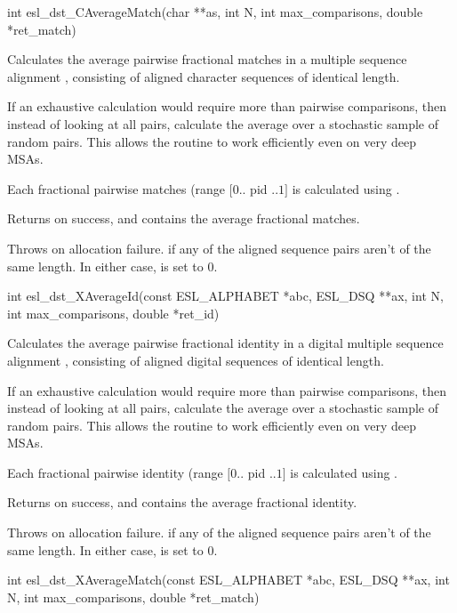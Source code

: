\begin{sreapi}
\hypertarget{func:esl_dst_CAverageMatch()}
{\item[int esl\_dst\_CAverageMatch(char **as, int N, int max\_comparisons, double *ret\_match)]}

Calculates the average pairwise fractional matches in
a multiple sequence alignment , consisting of 
aligned character sequences of identical length.

If an exhaustive calculation would require more than
 pairwise comparisons, then instead of
looking at all pairs, calculate the average over a
stochastic sample of  random pairs.
This allows the routine to work efficiently even on very
deep MSAs.

Each fractional pairwise matches (range $[0..$ pid $..1]$
is calculated using .

Returns  on success, and  contains the average
fractional matches.

Throws  on allocation failure.
 if any of the aligned sequence pairs aren't 
of the same length.
In either case,  is set to 0.


\hypertarget{func:esl_dst_XAverageId()}
{\item[int esl\_dst\_XAverageId(const ESL\_ALPHABET *abc, ESL\_DSQ **ax, int N, int max\_comparisons, double *ret\_id)]}

Calculates the average pairwise fractional identity in
a digital multiple sequence alignment , consisting of 
aligned digital sequences of identical length.

If an exhaustive calculation would require more than
 pairwise comparisons, then instead of
looking at all pairs, calculate the average over a
stochastic sample of  random pairs.
This allows the routine to work efficiently even on very
deep MSAs.

Each fractional pairwise identity (range $[0..$ pid $..1]$
is calculated using .

Returns  on success, and  contains the average
fractional identity.

Throws  on allocation failure.
 if any of the aligned sequence pairs aren't 
of the same length.
In either case,  is set to 0.


\hypertarget{func:esl_dst_XAverageMatch()}
{\item[int esl\_dst\_XAverageMatch(const ESL\_ALPHABET *abc, ESL\_DSQ **ax, int N, int max\_comparisons, double *ret\_match)]}


\end{sreapi}
